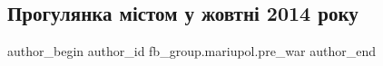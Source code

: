  
 
 
 
 

\subsection{Прогулянка містом у жовтні 2014 року}
\label{sec:09_02_2023.fb.fb_group.mariupol.pre_war.6.progulyanka_m_stom_u}

\ifcmt
 author_begin
   author_id fb_group.mariupol.pre_war
 author_end
\fi
